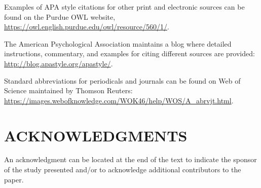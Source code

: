 \documentclass[10pt]{extarticle}
\begin{document}
Examples of APA style citations for other print and electronic sources can be found on the Purdue OWL website, \url{https://owl.english.purdue.edu/owl/resource/560/1/}.

The American Psychological Association maintains a blog where detailed instructions, commentary, and examples for citing different sources are provided: \url{http://blog.apastyle.org/apastyle/}.

Standard abbreviations for periodicals and journals can be found on Web of Science maintained by Thomson Reuters: \url{https://images.webofknowledge.com/WOK46/help/WOS/A_abrvjt.html}.  

\section*{ACKNOWLEDGMENTS}

An acknowledgment can be located at the end of the text to indicate the sponsor of the study presented and/or to acknowledge additional contributors to the paper. 
\end{document}
